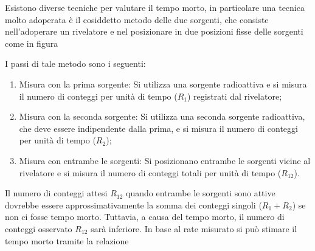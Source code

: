 \begin{esempio}
   Esistono diverse tecniche per valutare il tempo morto, in particolare una tecnica molto adoperata è il cosiddetto metodo delle due sorgenti, che consiste nell'adoperare un rivelatore e nel posizionare in due posizioni fisse delle sorgenti come in figura
   \begin{figure}[H]
      \centering
    \end{figure}
   I passi di tale metodo sono i seguenti:
   \begin{enumerate}[leftmargin=0.5cm]
      \item Misura con la prima sorgente: Si utilizza una sorgente radioattiva e si misura il numero di conteggi per unità di tempo ($R_1$) registrati dal rivelatore;
      \item Misura con la seconda sorgente: Si utilizza una seconda sorgente radioattiva, che deve essere indipendente dalla prima, e si misura il numero di conteggi per unità di tempo ($R_2$);
      \item Misura con entrambe le sorgenti: Si posizionano entrambe le sorgenti vicine al rivelatore e si misura il numero di conteggi totali per unità di tempo ($R_{12}$).
   \end{enumerate}
   Il numero di conteggi attesi $R_{12}$ quando entrambe le sorgenti sono attive dovrebbe essere approssimativamente la somma dei conteggi singoli ($R_1 + R_2$) se non ci fosse tempo morto. Tuttavia, a causa del tempo morto, il numero di conteggi osservato $R_{12}$ sarà inferiore. In base al rate misurato si può stimare il tempo morto tramite la relazione

\end{esempio}

